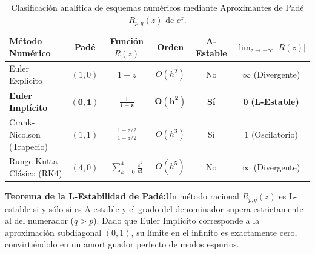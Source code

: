 \documentclass[11pt,a4paper]{article}
\newcommand{\takeaway}[2]{%
  \vspace{5pt}\noindent\colorbox{cyanaccent!8}{%
    \parbox{\dimexpr\linewidth-2\fboxsep\relax}{%
      \vspace{4pt}\textbf{\color{navy}#1:}\hspace{0.5em}#2\vspace{4pt}%
    }%
  }\vspace{5pt}%
}
\begin{document}
\begin{table}[!htbp]
    \centering
    \caption{Clasificación analítica de esquemas numéricos mediante Aproximantes de Padé $R_{p,q}(z)$ de $e^z$.}
    {\small
    \begin{tabularx}{\linewidth}{>{\raggedright\arraybackslash}Xccccc}
        \toprule
        \textbf{Método Numérico} & \textbf{Padé} & \textbf{Función $R(z)$} & \textbf{Orden} & \textbf{A-Estable} & \textbf{$\lim_{z \to -\infty} |R(z)|$} \\
        \midrule
        Euler Explícito & $(1, 0)$ & $1 + z$ & $O(h^2)$ & No & $\infty$ (Divergente) \\
        \textbf{Euler Implícito} & $\mathbf{(0, 1)}$ & $\mathbf{\frac{1}{1 - z}}$ & $\mathbf{O(h^2)}$ & \textbf{Sí} & $\mathbf{0}$ \textbf{(L-Estable)} \\
        Crank-Nicolson (Trapecio) & $(1, 1)$ & $\frac{1 + z/2}{1 - z/2}$ & $O(h^3)$ & Sí & $1$ (Oscilatorio) \\
        Runge-Kutta Clásico (RK4) & $(4, 0)$ & $\sum_{k=0}^4 \frac{z^k}{k!}$ & $O(h^5)$ & No & $\infty$ (Divergente) \\
        \bottomrule
    \end{tabularx}
    }
    \label{tab:pade_comparativo}
\end{table}

\takeaway{Teorema de la L-Estabilidad de Padé}{Un método racional $R_{p,q}(z)$ es L-estable si y sólo si es A-estable y el grado del denominador supera estrictamente al del numerador ($q > p$). Dado que Euler Implícito corresponde a la aproximación subdiagonal $(0, 1)$, su límite en el infinito es exactamente cero, convirtiéndolo en un amortiguador perfecto de modos espurios.}
\end{document}
